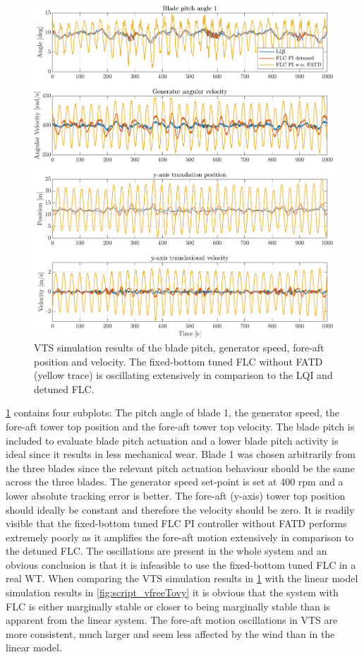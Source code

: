\begin{figure}[h]
	\centering
	\includegraphics[width=0.7\linewidth]{Graphics/TestResults/VTSplotting/3_th_w_py_vy.png}
	\caption{VTS simulation results of the blade pitch, generator speed, fore-aft position and velocity. The fixed-bottom tuned FLC without FATD (yellow trace) is oscillating extensively in comparison to the LQI and detuned FLC.}
	\label{fig:vts_3_th_w_py_vy}
\end{figure}

\cref{fig:vts_3_th_w_py_vy} contains four subplots: The pitch angle of blade 1, the generator speed, the fore-aft tower top position and the fore-aft tower top velocity. The blade pitch is included to evaluate blade pitch actuation and a lower blade pitch activity is ideal since it results in less mechanical wear. Blade 1 was chosen arbitrarily from the three blades since the relevant pitch actuation behaviour should be the same across the three blades. The generator speed set-point is set at 400 rpm and a lower absolute tracking error is better. The fore-aft (y-axis) tower top position should ideally be constant and therefore the velocity should be zero. It is readily visible that the fixed-bottom tuned FLC PI controller without FATD performs extremely poorly as it amplifies the fore-aft motion extensively in comparison to the detuned FLC. The oscillations are present in the whole system and an obvious conclusion is that it is infeasible to use the fixed-bottom tuned FLC in a real WT. When comparing the VTS simulation results in \cref{fig:vts_3_th_w_py_vy} with the linear model simulation results in \cref{fig:script_vfreeTovy} it is obvious that the system with FLC is either marginally stable or closer to being marginally stable than is apparent from the linear system. The fore-aft motion oscillations in VTS are more consistent, much larger and seem less affected by the wind than in the linear model. 

